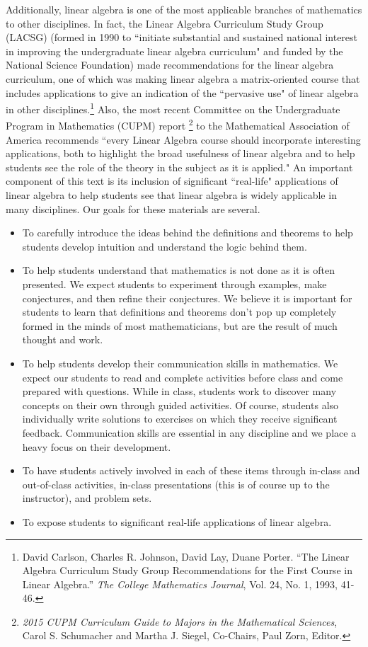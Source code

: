 Additionally, linear algebra is one of the most applicable branches of mathematics to other disciplines. In fact, the Linear Algebra Curriculum Study Group (LACSG) (formed in 1990 to ``initiate substantial and sustained national interest in improving the undergraduate linear algebra curriculum" and funded by the National Science Foundation) made recommendations for the linear algebra curriculum, one of which was making linear algebra a matrix-oriented course that includes applications to give an indication of the ``pervasive use" of linear algebra in other disciplines.\footnote{David Carlson, Charles R. Johnson, David Lay, Duane Porter. ``The Linear Algebra Curriculum Study Group Recommendations for the First Course in Linear Algebra.'' \emph{The College Mathematics Journal}, Vol. 24, No. 1, 1993, 41-46.}  Also, the most recent Committee on the Undergraduate Program in Mathematics (CUPM) report \footnote{\emph{2015 CUPM Curriculum Guide to Majors in the Mathematical Sciences}, Carol S. Schumacher and Martha J. Siegel, Co-Chairs, Paul Zorn, Editor.} to the Mathematical Association of America recommends ``every Linear Algebra course should incorporate interesting applications, both to highlight the broad usefulness of linear algebra and to help students see the role of the theory in the subject as it is applied." An important component of this text is its inclusion of significant ``real-life" applications of linear algebra to help students see that linear algebra is widely applicable in many disciplines. 
Our goals for these materials are several.
\begin{itemize}
\item To carefully introduce the ideas behind the definitions and theorems to help students develop intuition and understand the logic behind them.
\item To help students understand that mathematics is not done as it is often presented. We expect students to experiment through examples, make conjectures, and then refine their conjectures. We believe it is important for students to learn that definitions and theorems don't pop up completely formed in the minds of most mathematicians, but are the result of much thought and work.
\item To help students develop their communication skills in mathematics. We expect our students to read and complete activities before class and come prepared with questions. While in class, students work to discover many concepts on their own through guided activities.  Of course, students also individually write solutions to exercises on which they receive significant feedback. Communication skills are essential in any discipline and we place a heavy focus on their development.
\item To have students actively involved in each of these items through in-class and out-of-class activities, in-class presentations (this is of course up to the instructor), and problem sets.
\item To expose students to significant real-life applications of linear algebra.
\end{itemize}


